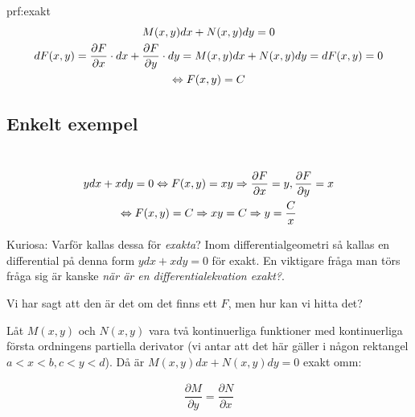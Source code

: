 \begin{prf}{prf:exakt}
  \begin{equation*}
    \begin{gathered}
      M(x,y)dx+N(x,y)dy=0\\
      dF(x,y)=\dfrac{\partial F}{\partial x}\cdot dx+\dfrac{\partial F}{\partial y}\cdot dy = M(x,y)dx+N(x,y)dy = dF(x,y)=0\\
      \Leftrightarrow F(x,y)=C
    \end{gathered}
\end{equation*}

\end{prf}


\subsection{Enkelt exempel}\hfill\\


\begin{equation*}
  \begin{gathered}
    ydx+xdy=0 \Leftrightarrow F(x,y)=xy \Rightarrow \dfrac{\partial F}{\partial x}=y, \dfrac{\partial F}{\partial y}=x\\
    \Leftrightarrow F(x,y)=C \Rightarrow xy = C \Rightarrow y=\dfrac{C}{x}
  \end{gathered}
\end{equation*}
\par\bigskip

\noindent Kuriosa: Varför kallas dessa för \textit{exakta}? Inom differentialgeometri så kallas en differential på denna form $ydx+xdy=0$ för exakt. En viktigare fråga man törs fråga sig är kanske \textit{när är en differentialekvation exakt?}.
\par\bigskip
\noindent Vi har sagt att den är det om det finns ett $F$, men hur kan vi hitta det?
\par\bigskip

\begin{theo}
  Låt $M(x,y)$ och $N(x,y)$ vara två kontinuerliga funktioner med kontinuerliga första ordningens partiella derivator (vi antar att det här gäller i någon rektangel $a<x<b, c<y<d$). Då är $M(x,y)dx+N(x,y)dy=0$ exakt omm:


  \begin{equation*}
    \begin{gathered}
      \dfrac{\partial M}{\partial y}=\dfrac{\partial N}{\partial x}
    \end{gathered}
  \end{equation*}

\end{theo}
\par\bigskip
\pagebreak

